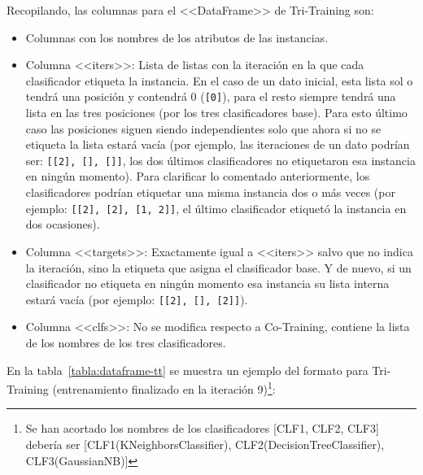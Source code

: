 Recopilando, las columnas para el <<DataFrame>> de Tri-Training son:

\begin{itemize}
    \item Columnas con los nombres de los atributos de las instancias.
    \item Columna <<iters>>: Lista de listas con la iteración en la que cada
    clasificador etiqueta la instancia. En el caso de un dato inicial, esta
    lista sol o tendrá una posición y contendrá 0 (\texttt{[0]}), para el resto
    siempre tendrá una lista en las tres posiciones (por los tres clasificadores
    base). Para esto último caso las posiciones siguen siendo independientes
    solo que ahora si no se etiqueta la lista estará vacía (por ejemplo, las
    iteraciones de un dato podrían ser: \texttt{[[2], [], []]}, los dos últimos
    clasificadores no etiquetaron esa instancia en ningún momento). Para
    clarificar lo comentado anteriormente, los clasificadores podrían etiquetar
    una misma instancia dos o más veces (por ejemplo: \texttt{[[2], [2], [1,
    2]]}, el último clasificador etiquetó la instancia en dos ocasiones).
    \item Columna <<targets>>: Exactamente igual a <<iters>> salvo que no indica
    la iteración, sino la etiqueta que asigna el clasificador base. Y de nuevo,
    si un clasificador no etiqueta en ningún momento esa instancia su lista
    interna estará vacía (por ejemplo: \texttt{[[2], [], [2]]}).
    \item Columna <<clfs>>: No se modifica respecto a Co-Training, contiene la
    lista de los nombres de los tres clasificadores.
\end{itemize}

En la tabla~\ref{tabla:dataframe-tt} se muestra un ejemplo del formato para
Tri-Training (entrenamiento finalizado en la iteración 9)\footnote{Se han
acortado los nombres de los clasificadores [CLF1, CLF2, CLF3] debería ser
[CLF1(KNeighborsClassifier), CLF2(DecisionTreeClassifier), CLF3(GaussianNB)]}:
\begin{table}[H]
    \caption{Ejemplo de DataFrame de Tri-Training}
    \label{tabla:dataframe-tt}
\end{table}

